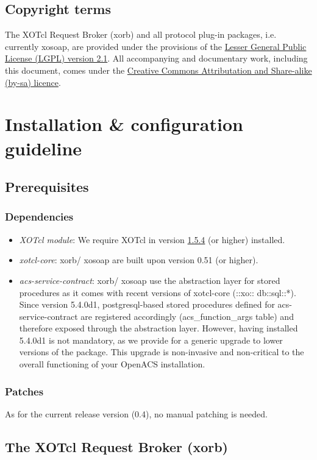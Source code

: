 \subsection{Copyright terms}
The XOTcl Request Broker (xorb) and all protocol plug-in packages, i.e. currently xosoap, are provided 
under the provisions of the \href{http://creativecommons.org/licenses/LGPL/2.1/}{Lesser General Public 
License (LGPL) version 2.1}. All accompanying and documentary work, including this document, comes 
under the \href{http://creativecommons.org/licenses/by-sa/2.0/at/}{Creative Commons Attributation and 
Share-alike (by-sa) licence}.

     \section{Installation \& configuration guideline}
     	\subsection{Prerequisites}
	\subsubsection{Dependencies}
	\begin{itemize}
	\item \emph{XOTcl module}: We require XOTcl in version \href{http://media.wu-wien.ac.at/download/xotcl-1.5.4.tar.gz}{1.5.4} (or higher) installed.
	\item \emph{xotcl-core}: xorb/ xosoap are built upon version 0.51 (or higher).
	\item \emph{acs-service-contract}: xorb/ xosoap use the abstraction layer for stored procedures as it comes with recent versions of xotcl-core (::xo:: db::sql::*). Since version 5.4.0d1, postgresql-based stored procedures defined for acs-service-contract  are registered accordingly (acs\_function\_args table) and therefore exposed through the abstraction layer. However, having installed 5.4.0d1 is not mandatory, as we provide for a generic upgrade to lower versions of the package. This upgrade is non-invasive and non-critical to the overall functioning of your OpenACS installation.
	\end{itemize}
	\subsubsection{Patches}
	As for the current release version (0.4), no manual patching is needed.
	\subsection{The XOTcl Request Broker (xorb)}
 
